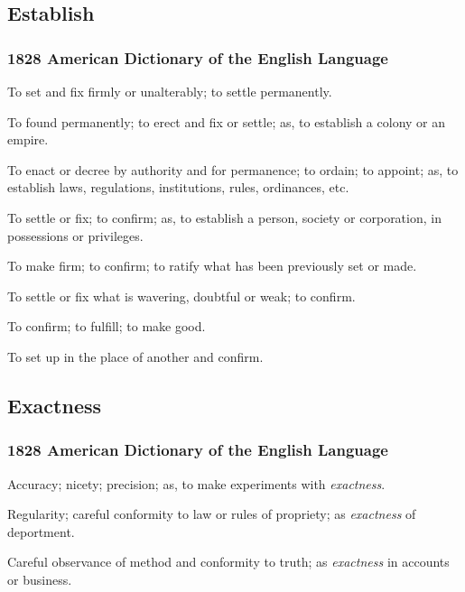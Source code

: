 	\subsection{Establish} %
		\label{ESTABLISH}
		
		\subsubsection{1828 American Dictionary of the English Language}
		
			\begin{compactitem}
				\item[1] To set and fix firmly or unalterably; to settle permanently.
				\item[2] To found permanently; to erect and fix or settle; as, to establish a colony or an empire.
				\item[3] To enact or decree by authority and for permanence; to ordain; to appoint; as, to establish laws, regulations, institutions, rules, ordinances, etc.
				\item[4] To settle or fix; to confirm; as, to establish a person, society or corporation, in possessions or privileges.
				\item[5] To make firm; to confirm; to ratify what has been previously set or made.
				\item[6] To settle or fix what is wavering, doubtful or weak; to confirm.
				\item[7] To confirm; to fulfill; to make good.
				\item[8] To set up in the place of another and confirm.
			\end{compactitem}
			
	\subsection{Exactness} %
		\label{EXACTNESS}
		
		\subsubsection{1828 American Dictionary of the English Language}
		
			\begin{compactitem}
				\item Accuracy; nicety; precision; as, to make experiments with \textit{exactness}.
				\item[1] Regularity; careful conformity to law or rules of propriety; as \textit{exactness} of deportment.
				\item[2] Careful observance of method and conformity to truth; as \textit{exactness} in accounts or business.
			\end{compactitem}

